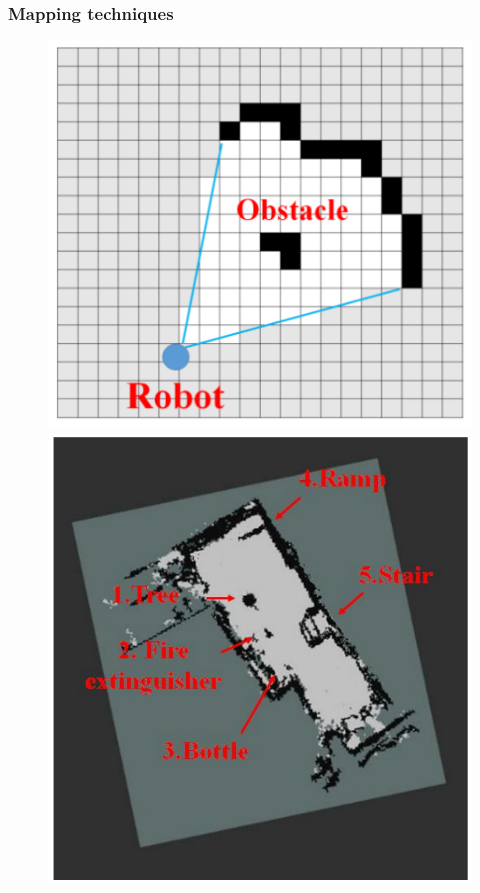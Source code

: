 \documentclass[12pt]{article}
\begin{document}
\subsubsection{Mapping techniques}
\begin{figure}[h]
    \centering
     \begin{minipage}{0.4\textwidth}
        \centering
        \includegraphics[width=\linewidth]{occupancy_grid} %
    \end{minipage}\hfill
    \begin{minipage}{0.4\textwidth}
        \centering
        \includegraphics[width=\linewidth]{complex_occ_grid} %

\end{minipage}
\end{figure}
\end{document}
